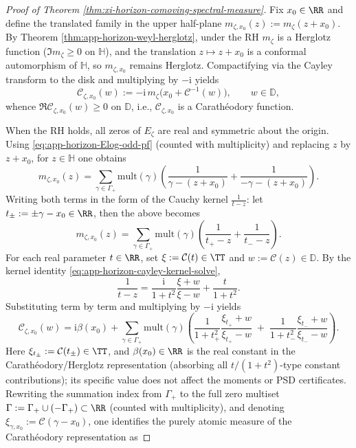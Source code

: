 \begin{proof}[Proof of Theorem \ref{thm:xi-horizon-comoving-spectral-measure}]
Fix \(x_0\in\RR\) and define the translated family in the upper half-plane
\(
m_{\zeta,x_0}(z):=m_{\zeta}(z+x_0)
\).
By Theorem \ref{thm:app-horizon-weyl-herglotz}, under the RH \(m_{\zeta}\) is a Herglotz function (\(\Im m_{\zeta}\ge 0\) on \(\mathbb{H}\)), and the translation \(z\mapsto z+x_0\) is a conformal automorphism of \(\mathbb{H}\), so \(m_{\zeta,x_0}\) remains Herglotz.
Compactifying via the Cayley transform to the disk and multiplying by \(-\mathrm{i}\) yields
\[
\mathscr{C}_{\zeta,x_0}(w):=-\mathrm{i}\,m_{\zeta}\!\bigl(x_0+\mathcal{C}^{-1}(w)\bigr),
\qquad w\in\mathbb{D},
\]
whence \(\Re \mathscr{C}_{\zeta,x_0}(w)\ge 0\) on \(\mathbb{D}\), i.e., \(\mathscr{C}_{\zeta,x_0}\) is a Carath\'eodory function.
\par
When the RH holds, all zeros of \(E_{\zeta}\) are real and symmetric about the origin.
Using \eqref{eq:app-horizon-Elog-odd-pf} (counted with multiplicity) and replacing \(z\) by \(z+x_0\), for \(z\in\mathbb{H}\) one obtains
\[
m_{\zeta,x_0}(z)
=
\sum_{\gamma\in\Gamma_+}\mathrm{mult}(\gamma)\!\left(\frac{1}{\gamma-(z+x_0)}+\frac{1}{-\gamma-(z+x_0)}\right).
\]
Writing both terms in the form of the Cauchy kernel \(\frac{1}{t-z}\): let
\(
t_{\pm}:=\pm\gamma-x_0\in\RR
\), then the above becomes
\[
m_{\zeta,x_0}(z)
=
\sum_{\gamma\in\Gamma_+}\mathrm{mult}(\gamma)\!\left(\frac{1}{t_+-z}+\frac{1}{t_--z}\right).
\]
For each real parameter \(t\in\RR\), set \(\xi:=\mathcal{C}(t)\in\TT\) and \(w:=\mathcal{C}(z)\in\mathbb{D}\).
By the kernel identity \eqref{eq:app-horizon-cayley-kernel-solve},
\[
\frac{1}{t-z}
=\frac{\mathrm{i}}{1+t^{2}}\frac{\xi+w}{\xi-w}+\frac{t}{1+t^{2}}.
\]
Substituting term by term and multiplying by \(-\mathrm{i}\) yields
\[
\mathscr{C}_{\zeta,x_0}(w)
=\mathrm{i}\beta(x_0)
+\sum_{\gamma\in\Gamma_+}\mathrm{mult}(\gamma)
\left(
\frac{1}{1+t_+^2}\frac{\xi_{t_+}+w}{\xi_{t_+}-w}
\;+\;
\frac{1}{1+t_-^2}\frac{\xi_{t_-}+w}{\xi_{t_-}-w}
\right).
\]
Here \(\xi_{t_\pm}:=\mathcal{C}(t_\pm)\in\TT\), and \(\beta(x_0)\in\RR\) is the real constant in the Carath\'eodory/Herglotz representation (absorbing all \(t/(1+t^2)\)-type constant contributions); its specific value does not affect the moments or PSD certificates.
Rewriting the summation index from \(\Gamma_+\) to the full zero multiset \(\Gamma:=\Gamma_+\cup(-\Gamma_+)\subset\RR\) (counted with multiplicity), and denoting
\(
\xi_{\gamma,x_0}:=\mathcal{C}(\gamma-x_0)
\), one identifies the purely atomic measure of the Carath\'eodory representation as

\end{proof}
